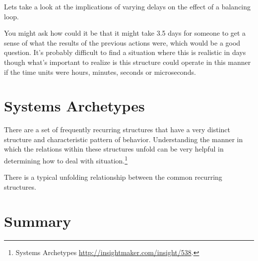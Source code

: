 \documentclass[]{memoir}
\begin{document}
\begin{model}[frametitle={Model: }] 

 Lets take a look at the implications of varying delays on the effect of a balancing loop.




 \end{model}

You might ask how could it be that it might take 3.5 days for someone to
get a sense of what the results of the previous actions were, which
would be a good question. It's probably difficult to find a situation
where this is realistic in days though what's important to realize is
this structure could operate in this manner if the time units were
hours, minutes, seconds or microseconds.

\section{Systems Archetypes}

There are a set of frequently recurring structures that have a very
distinct structure and characteristic pattern of behavior. Understanding
the manner in which the relations within these structures unfold can be
very helpful in determining how to deal with situation.\footnote{Systems
  Archetypes \url{http://insightmaker.com/insight/538}.}

\FloatBarrier 

\begin{model}[frametitle={Model: Systems Archetypes}] 

 There is a typical unfolding relationship between the common recurring structures.




 \end{model}

\section{Summary}
\end{document}
